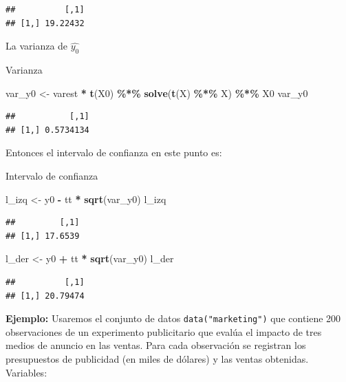 \documentclass[
]{book}
\newenvironment{Shaded}{\begin{snugshade}}{\end{snugshade}}
\newcommand{\FunctionTok}[1]{\textcolor[rgb]{0.13,0.29,0.53}{\textbf{#1}}}
\newcommand{\NormalTok}[1]{#1}
\newcommand{\OtherTok}[1]{\textcolor[rgb]{0.56,0.35,0.01}{#1}}
\newcommand{\SpecialCharTok}[1]{\textcolor[rgb]{0.81,0.36,0.00}{\textbf{#1}}}
\begin{document}
\begin{verbatim}
##          [,1]
## [1,] 19.22432
\end{verbatim}

La varianza de \(\hat{y_0}\)

Varianza

\begin{Shaded}
\begin{Highlighting}[]
\NormalTok{var\_y0 }\OtherTok{\textless{}{-}}\NormalTok{ varest }\SpecialCharTok{*} \FunctionTok{t}\NormalTok{(X0) }\SpecialCharTok{\%*\%} \FunctionTok{solve}\NormalTok{(}\FunctionTok{t}\NormalTok{(X) }\SpecialCharTok{\%*\%}\NormalTok{ X) }\SpecialCharTok{\%*\%}\NormalTok{ X0}
\NormalTok{var\_y0}
\end{Highlighting}
\end{Shaded}

\begin{verbatim}
##           [,1]
## [1,] 0.5734134
\end{verbatim}

Entonces el intervalo de confianza en este punto es:

Intervalo de confianza

\begin{Shaded}
\begin{Highlighting}[]
\NormalTok{l\_izq }\OtherTok{\textless{}{-}}\NormalTok{ y0 }\SpecialCharTok{{-}}\NormalTok{ tt }\SpecialCharTok{*} \FunctionTok{sqrt}\NormalTok{(var\_y0) }
\NormalTok{l\_izq}
\end{Highlighting}
\end{Shaded}

\begin{verbatim}
##         [,1]
## [1,] 17.6539
\end{verbatim}

\begin{Shaded}
\begin{Highlighting}[]
\NormalTok{l\_der }\OtherTok{\textless{}{-}}\NormalTok{ y0 }\SpecialCharTok{+}\NormalTok{ tt }\SpecialCharTok{*} \FunctionTok{sqrt}\NormalTok{(var\_y0) }
\NormalTok{l\_der}
\end{Highlighting}
\end{Shaded}

\begin{verbatim}
##          [,1]
## [1,] 20.79474
\end{verbatim}

\textbf{Ejemplo: } Usaremos el conjunto de datos \texttt{data("marketing")} que contiene 200 observaciones de un experimento publicitario que evalúa el impacto de tres medios de anuncio en las ventas. Para cada observación se registran los presupuestos de publicidad (en miles de dólares) y las ventas obtenidas.
Variables:
\end{document}

